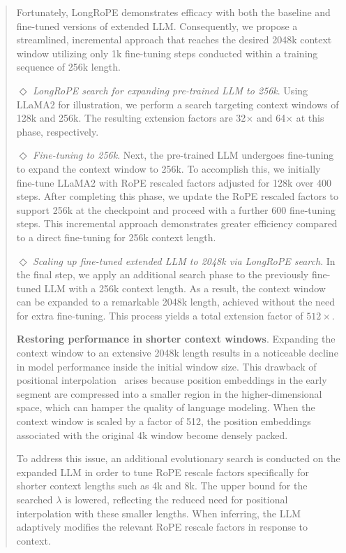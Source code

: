 \begin{abstract}
Fortunately, LongRoPE demonstrates efficacy with both the baseline and fine-tuned versions of extended LLM. Consequently, we propose a streamlined, incremental approach that reaches the desired 2048k context window utilizing only 1k fine-tuning steps conducted within a training sequence of 256k length.

$\Diamond$ \textit{LongRoPE search for expanding pre-trained LLM to 256k}. Using LLaMA2 for illustration, we perform a search targeting context windows of 128k and 256k. The resulting extension factors are 32$\times$ and 64$\times$ at this phase, respectively.

$\Diamond$ \textit{Fine-tuning to 256k}. Next, the pre-trained LLM undergoes fine-tuning to expand the context window to 256k. To accomplish this, we initially fine-tune LLaMA2 with RoPE rescaled factors adjusted for 128k over 400 steps. After completing this phase, we update the RoPE rescaled factors to support 256k at the checkpoint and proceed with a further 600 fine-tuning steps. This incremental approach demonstrates greater efficiency compared to a direct fine-tuning for 256k context length.

$\Diamond$ \textit{Scaling up fine-tuned extended LLM to 2048k via LongRoPE search}. In the final step, we apply an additional search phase to the previously fine-tuned LLM with a 256k context length. As a result, the context window can be expanded to a remarkable 2048k length, achieved without the need for extra fine-tuning. This process yields a total extension factor of $512\times$.

\textbf{Restoring performance in shorter context windows}.  Expanding the context window to an extensive 2048k length results in a noticeable decline in model performance inside the initial window size. This drawback of positional interpolation~\cite{pi} arises because position embeddings in the early segment are compressed into a smaller region in the higher-dimensional space, which can hamper the quality of language modeling. When the context window is scaled by a factor of 512, the position embeddings associated with the original 4k window become densely packed.

To address this issue, an additional evolutionary search is conducted on the expanded LLM in order to tune RoPE rescale factors specifically for shorter context lengths such as 4k and 8k. The upper bound for the searched $\lambda$ is lowered, reflecting the reduced need for positional interpolation with these smaller lengths. When inferring, the LLM adaptively modifies the relevant RoPE rescale factors in response to context.


\end{abstract}
